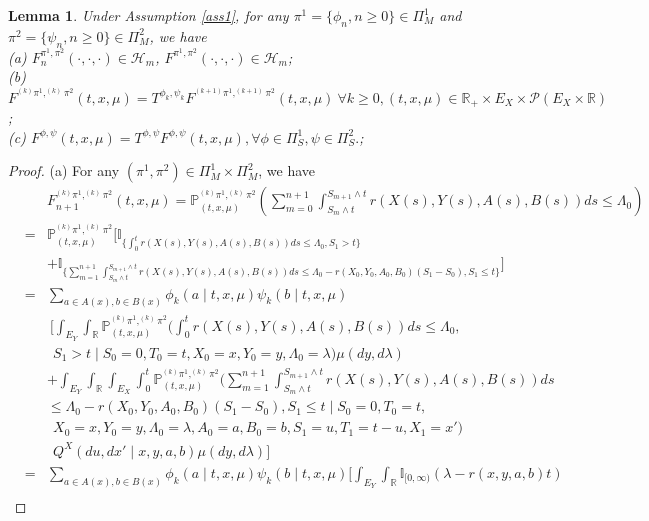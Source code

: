 \documentclass[12pt]{article}
\newtheorem{lemma}{Lemma}
\begin{document}
\begin{lemma}\label{lem1}
Under Assumption \ref{ass1}, for any $\pi^1=\{\phi_n,n\ge 0\}\in \Pi_M^1$ and $\pi^2=\{\psi_n,n\ge 0\}\in \Pi_M^2$, we have
\\(a) $F_n^{\pi^1,\pi^2}(\cdot,\cdot,\cdot)\in\mathscr{H}_m$,
$F^{\pi^1,\pi^2}(\cdot,\cdot,\cdot)\in\mathscr{H}_m$;
\\(b)
$F^{^{(k)}\pi^1,^{(k)}\pi^2}(t,x,\mu)
=T^{\phi_k,\psi_k}F^{^{(k+1)}\pi^1,^{(k+1)}\pi^2}(t,x,\mu)~
\forall k\ge 0, (t,x,\mu)\in \mathbb{R}_+\times E_X\times \mathscr{P}(E_X\times \mathbb{R})$;
\\(c)
$F^{\phi,\psi}(t,x,\mu)
=T^{\phi,\psi}F^{\phi,\psi}(t,x,\mu), \forall \phi\in\Pi_S^1, \psi\in\Pi_S^2.$;
\end{lemma}
\begin{proof}
(a) For any $(\pi^1,\pi^2)\in \Pi_M^1\times\Pi_M^2$, we have
\begin{eqnarray*}
&&F_{n+1}^{^{(k)}\pi^1,^{(k)}\pi^2}(t,x,\mu)
=\mathbb{P}^{^{(k)}\pi^1,^{(k)}\pi^2}_{(t,x,\mu)}(\sum_{m=0}^{n+1}\int_{S_m\wedge t}^{S_{m+1}\wedge t} r(X(s),Y(s),A(s),B(s))ds\leq \Lambda_0)\\
&=&\mathbb{P}^{^{(k)}\pi^1,^{(k)}\pi^2}_{(t,x,\mu)}\big[
\mathbb{I}_{\{\int_{0}^{t} r(X(s),Y(s),A(s),B(s))ds\leq \Lambda_0,S_1>t\}}\\
&&+\mathbb{I}_{\{\sum_{m=1}^{n+1}\int_{S_m\wedge t}^{S_{m+1}\wedge t} r(X(s),Y(s),A(s),B(s))ds\leq \Lambda_0-r(X_0,Y_0,A_0,B_0)(S_1-S_0),S_1\leq t\}}\big]\\
&=&\sum_{a\in A(x), b\in B(x)}\phi_k(a\mid t,x,\mu)\psi_k(b\mid t,x,\mu)\\
&&~
\bigg[\int_{E_Y}\int_{\mathbb{R}}
\mathbb{P}^{^{(k)}\pi^1,^{(k)}\pi^2}_{(t,x,\mu)}
(\int_{0}^{t} r(X(s),Y(s),A(s),B(s))ds\leq \Lambda_0,\\
&&~~S_1>t\mid S_0=0,T_0=t,X_0=x,Y_0=y,\Lambda_0=\lambda)\mu(dy,d\lambda)\\
&&+\int_{E_Y}\int_{\mathbb{R}}\int_{E_X}\int_0^t
\mathbb{P}^{^{(k)}\pi^1,^{(k)}\pi^2}_{(t,x,\mu)}
(\sum_{m=1}^{n+1}\int_{S_m\wedge t}^{S_{m+1}\wedge t} r(X(s),Y(s),A(s),B(s))ds\\
&&\leq \Lambda_0-r(X_0,Y_0,A_0,B_0)(S_1-S_0),S_1\leq t \mid S_0=0,T_0=t,\\
&&~~X_0=x,Y_0=y,\Lambda_0=\lambda,A_0=a,B_0=b,S_1=u,T_1=t-u,X_1=x')\\
&&~~Q^X(du,dx'\mid x,y,a,b)\mu(dy,d\lambda)\bigg]\\
&=&\sum_{a\in A(x), b\in B(x)}\phi_k(a\mid t,x,\mu)\psi_k(b\mid t,x,\mu)
\bigg[\int_{E_Y}\int_{\mathbb{R}}\mathbb{I}_{[0,\infty)}(\lambda-r(x,y,a,b)t)\\

\end{eqnarray*}
\end{proof}
\end{document}
